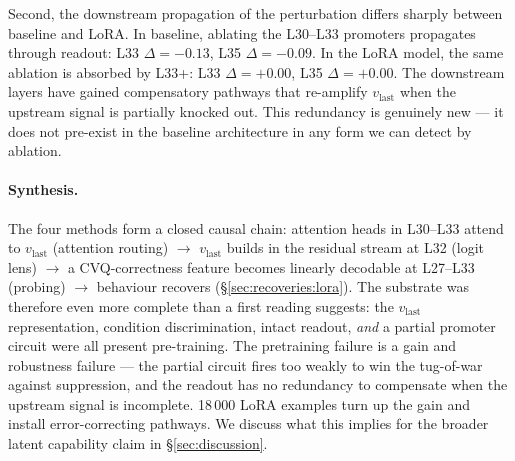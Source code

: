 Second, the downstream propagation of the perturbation differs
sharply between baseline and LoRA. In baseline, ablating the L30--L33
promoters propagates through readout: L33 $\Delta {=} -0.13$, L35
$\Delta {=} -0.09$. In the LoRA model, the same ablation is absorbed
by L33+: L33 $\Delta {=} {+}0.00$, L35 $\Delta {=} {+}0.00$. The
downstream layers have gained compensatory pathways that re-amplify
$v_{\text{last}}$ when the upstream signal is partially knocked out.
This redundancy is genuinely new --- it does not pre-exist in the
baseline architecture in any form we can detect by ablation.

\paragraph{Synthesis.}
The four methods form a closed causal chain: attention heads in
L30--L33 attend to $v_{\text{last}}$ (attention routing) $\to$
$v_{\text{last}}$ builds in the residual stream at L32 (logit lens)
$\to$ a CVQ-correctness feature becomes linearly decodable at L27--L33
(probing) $\to$ behaviour recovers (\S\ref{sec:recoveries:lora}).
The substrate was therefore even more complete than a first reading
suggests: the $v_{\text{last}}$ representation, condition
discrimination, intact readout, \emph{and} a partial promoter circuit
were all present pre-training. The pretraining failure is a gain and
robustness failure --- the partial circuit fires too weakly to win
the tug-of-war against suppression, and the readout has no redundancy
to compensate when the upstream signal is incomplete. 18\,000 LoRA
examples turn up the gain and install error-correcting pathways. We
discuss what this implies for the broader latent capability claim in
\S\ref{sec:discussion}.

\begin{table}[t]
\centering
\small

\caption{Cross-method bootstrap 95\% CIs on the focal mechanistic
deltas at the L30--L33 band, baseline vs +LoRA. Probing and
attention routing aggregate across the relevant heads or layers;
logit-lens rows report $\Pr(v_{\text{last}})$ at L32 for the focal
$(K, N)$ cells in our analysis.}
\label{tab:mechanism}
\end{table}

\begin{table}[t]
\centering
\small

\caption{Stage~3C four-way causal-ablation summary. Each row reports
the paired within-run $\Delta {=}$ ablated $-$ normal at four
representative layers. The bold row is the new baseline control
($K{=}2, N{=}5$, 50 trials per cell, CVQ condition):
ablating the same eight LoRA-promoter heads in the \emph{baseline}
model produces a comparable L32 drop
($-0.377$ vs $-0.278$ in the LoRA model), establishing that the heads
were partial $v_{\text{last}}$ carriers pre-LoRA. The downstream
columns (L33, L35) tell the complementary story: baseline ablation
propagates through readout ($-0.133$, $-0.088$); the LoRA model
absorbs the same perturbation at L33+ ($+0.000$, $+0.000$),
revealing the new downstream redundancy.}
\label{tab:ablation_fourway}
\end{table}


